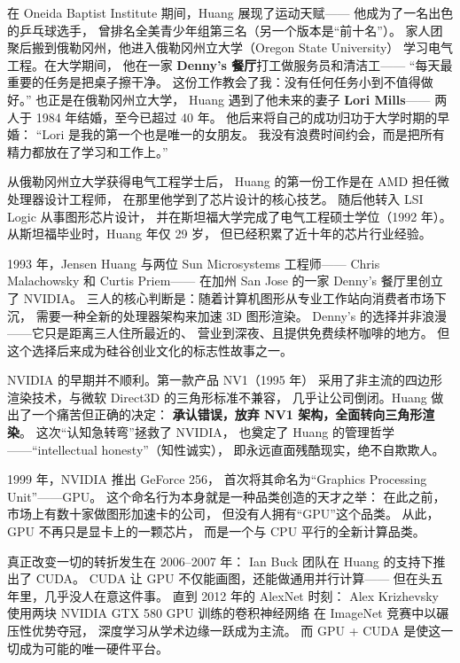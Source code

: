 \begin{corebox}
在 Oneida Baptist Institute 期间，Huang 展现了运动天赋——
他成为了一名出色的乒乓球选手，
曾排名全美青少年组第三名（另一个版本是``前十名''）。
家人团聚后搬到俄勒冈州，他进入俄勒冈州立大学（Oregon State University）
学习电气工程。在大学期间，
他在一家 \textbf{Denny's 餐厅}打工做服务员和清洁工——
``每天最重要的任务是把桌子擦干净。
这份工作教会了我：没有任何任务小到不值得做好。''
也正是在俄勒冈州立大学，
Huang 遇到了他未来的妻子 \textbf{Lori Mills}——
两人于 1984 年结婚，至今已超过 40 年。
他后来将自己的成功归功于大学时期的早婚：
``Lori 是我的第一个也是唯一的女朋友。
我没有浪费时间约会，而是把所有精力都放在了学习和工作上。''
\end{corebox}

从俄勒冈州立大学获得电气工程学士后，
Huang 的第一份工作是在 AMD 担任微处理器设计工程师，
在那里他学到了芯片设计的核心技艺。
随后他转入 LSI Logic 从事图形芯片设计，
并在斯坦福大学完成了电气工程硕士学位（1992 年）。
从斯坦福毕业时，Huang 年仅 29 岁，
但已经积累了近十年的芯片行业经验。

\begin{whybox}
1993 年，Jensen Huang 与两位 Sun Microsystems 工程师——
Chris Malachowsky 和 Curtis Priem——
在加州 San Jose 的一家 Denny's 餐厅里创立了 NVIDIA。
三人的核心判断是：随着计算机图形从专业工作站向消费者市场下沉，
需要一种全新的处理器架构来加速 3D 图形渲染。
Denny's 的选择并非浪漫——它只是距离三人住所最近的、
营业到深夜、且提供免费续杯咖啡的地方。
但这个选择后来成为硅谷创业文化的标志性故事之一。
\end{whybox}

NVIDIA 的早期并不顺利。第一款产品 NV1（1995 年）
采用了非主流的四边形渲染技术，与微软 Direct3D 的三角形标准不兼容，
几乎让公司倒闭。Huang 做出了一个痛苦但正确的决定：
\textbf{承认错误，放弃 NV1 架构，全面转向三角形渲染}。
这次``认知急转弯''拯救了 NVIDIA，
也奠定了 Huang 的管理哲学——``intellectual honesty''（知性诚实），
即永远直面残酷现实，绝不自欺欺人。

1999 年，NVIDIA 推出 GeForce 256，
首次将其命名为``Graphics Processing Unit''——GPU。
这个命名行为本身就是一种品类创造的天才之举：
在此之前，市场上有数十家做图形加速卡的公司，
但没有人拥有``GPU''这个品类。
从此，GPU 不再只是显卡上的一颗芯片，
而是一个与 CPU 平行的全新计算品类。

真正改变一切的转折发生在 2006--2007 年：
Ian Buck 团队在 Huang 的支持下推出了 CUDA。
CUDA 让 GPU 不仅能画图，还能做通用并行计算——
但在头五年里，几乎没人在意这件事。
直到 2012 年的 AlexNet 时刻：
Alex Krizhevsky 使用两块 NVIDIA GTX 580 GPU 训练的卷积神经网络
在 ImageNet 竞赛中以碾压性优势夺冠，
深度学习从学术边缘一跃成为主流。
而 GPU + CUDA 是使这一切成为可能的唯一硬件平台。

